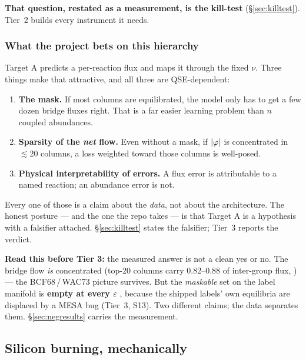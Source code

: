 \textbf{That question, restated as a measurement, is the kill-test}
(\S\ref{sec:killtest}). Tier~2 builds every instrument it needs.

\subsubsection{What the project bets on this hierarchy}
\label{sec:bet}

Target A predicts a per-reaction flux \Phifl{} and maps it through the fixed
$\nu$. Three things make that attractive, and all three are QSE-dependent:

\begin{enumerate}
\item \textbf{The mask.} If most columns are equilibrated, the model only has to
  get a few dozen bridge fluxes right. That is a far easier learning problem
  than $n$ coupled abundances.
\item \textbf{Sparsity of the \emph{net} flow.} Even without a mask, if
  $|\varphi|$ is concentrated in $\lesssim 20$ columns, a loss weighted toward
  those columns is well-posed.
\item \textbf{Physical interpretability of errors.} A flux error is attributable
  to a named reaction; an abundance error is not.
\end{enumerate}

Every one of those is a claim about the \emph{data}, not about the architecture.
The honest posture --- and the one the repo takes --- is that Target A is a
hypothesis with a falsifier attached. \S\ref{sec:killtest} states the falsifier;
Tier~3 reports the verdict.

\begin{result}
\textbf{Read this before Tier 3:} the measured answer is not a clean yes or no.
The bridge flow \emph{is} concentrated (top-20 columns carry 0.82--0.88 of
inter-group flux, ) --- the BCF68\,/\,WAC73 picture
survives. But the \emph{maskable} set on the label manifold is \textbf{empty at
every $\varepsilon$} , because the shipped labels' own
equilibria are displaced by a MESA bug (Tier~3, S13). Two different claims; the
data separates them. \S\ref{sec:negresults} carries the measurement.
\end{result}

\subsection{Silicon burning, mechanically}
\label{sec:sibmech}

